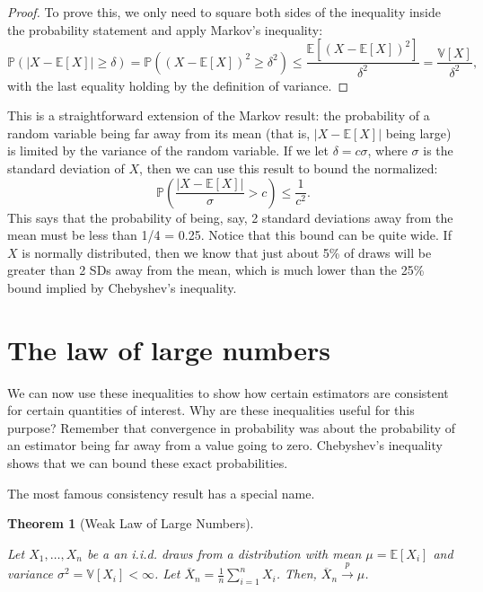 \documentclass[
  letterpaper,
  DIV=11,
  numbers=noendperiod]{scrreprt}
\newcommand{\E}{\mathbb{E}}
\newcommand{\V}{\mathbb{V}}
\renewcommand{\P}{\mathbb{P}}
\newcommand{\Xbar}{\overline{X}}
\newcommand{\inprob}{\overset{p}{\to}}
\theoremstyle{definition}
\theoremstyle{plain}
\newtheorem{theorem}{Theorem}[chapter]
\theoremstyle{definition}
\theoremstyle{remark}
\begin{document}
\begin{proof}

To prove this, we only need to square both sides of the inequality
inside the probability statement and apply Markov's inequality: \[
\P\left( |X - \E[X]| \geq \delta \right) = \P((X-\E[X])^2 \geq \delta^2) \leq \frac{\E[(X - \E[X])^2]}{\delta^2} = \frac{\V[X]}{\delta^2},
\] with the last equality holding by the definition of variance.

\end{proof}

This is a straightforward extension of the Markov result: the
probability of a random variable being far away from its mean (that is,
\(|X-\E[X]|\) being large) is limited by the variance of the random
variable. If we let \(\delta = c\sigma\), where \(\sigma\) is the
standard deviation of \(X\), then we can use this result to bound the
normalized: \[
\P\left(\frac{|X - \E[X]|}{\sigma} > c \right) \leq \frac{1}{c^2}.
\] This says that the probability of being, say, 2 standard deviations
away from the mean must be less than 1/4 = 0.25. Notice that this bound
can be quite wide. If \(X\) is normally distributed, then we know that
just about 5\% of draws will be greater than 2 SDs away from the mean,
which is much lower than the 25\% bound implied by Chebyshev's
inequality.

\hypertarget{the-law-of-large-numbers}{%
\section{The law of large numbers}\label{the-law-of-large-numbers}}

We can now use these inequalities to show how certain estimators are
consistent for certain quantities of interest. Why are these
inequalities useful for this purpose? Remember that convergence in
probability was about the probability of an estimator being far away
from a value going to zero. Chebyshev's inequality shows that we can
bound these exact probabilities.

The most famous consistency result has a special name.

\leavevmode{}%
\begin{theorem}[Weak Law of Large Numbers]\label{thm-lln}

Let \(X_1, \ldots, X_n\) be a an i.i.d. draws from a distribution with
mean \(\mu = \E[X_i]\) and variance \(\sigma^2 = \V[X_i] < \infty\). Let
\(\Xbar_n = \frac{1}{n} \sum_{i =1}^n X_i\). Then,
\(\Xbar_n \inprob \mu\).

\end{theorem}
\end{document}
